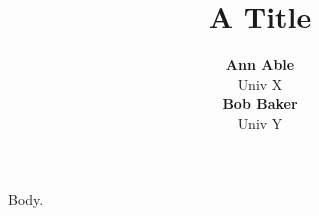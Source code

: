 \documentclass{article}
\begin{document}
\title{A Title}
\author{\begin{tabular}{c}\textbf{Ann Able}\\ Univ X\\ \textbf{Bob Baker}\\ Univ Y\end{tabular}}
\maketitle
Body.
\end{document}
